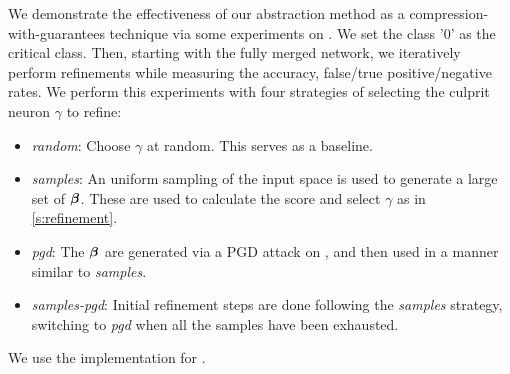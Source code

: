 We demonstrate the effectiveness of our abstraction method as a
compression-with-guarantees technique via some experiments on \mnist. We set the
class '0'
as the critical class. Then, starting with the fully merged network, we
iteratively perform refinements while measuring the accuracy, false/true
positive/negative rates. We perform this experiments with four strategies of
selecting the culprit neuron $\gamma$ to refine:

\begin{itemize}
    \item \textit{random}: Choose $\gamma$ at random. This serves as a
        baseline.
    \item \textit{samples}: An uniform sampling of the input space is used to
        generate a large set of \gencex $\boldsymbol{\beta}$. These are used to
        calculate the score and select $\gamma$ as in 
        \ref{s:refinement}.
    \item \textit{pgd}: The $\boldsymbol{\beta}$ are generated via a PGD
        \cite{pgd, pgd-attack} attack on \abs, and then used in a manner similar
        to \textit{samples}.
    \item \textit{samples-pgd}: Initial refinement steps are done following the
        \textit{samples} strategy, switching to \textit{pgd} when all the
        samples have been exhausted.
\end{itemize}

We use the \abcrown implementation for \pgd.

